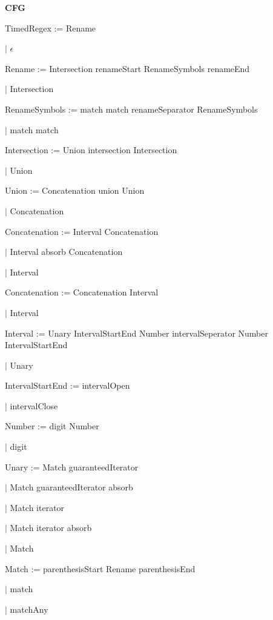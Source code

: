
\textbf{CFG}

TimedRegex := Rename

\qquad	$\mid$ $\epsilon$

Rename := Intersection renameStart RenameSymbols renameEnd

\qquad $\mid$ Intersection

RenameSymbols := match match renameSeparator RenameSymbols

\qquad $\mid$ match match

Intersection := Union intersection Intersection

\qquad $\mid$ Union

Union := Concatenation union Union

\qquad $\mid$ Concatenation

Concatenation := Interval Concatenation

\qquad $\mid$ Interval absorb Concatenation

\qquad $\mid$ Interval

Concatenation := Concatenation Interval

\qquad $\mid$ Interval

Interval := Unary IntervalStartEnd Number intervalSeperator Number IntervalStartEnd

\qquad $\mid$ Unary

IntervalStartEnd := intervalOpen

\qquad $\mid$ intervalClose

Number := digit Number

\qquad $\mid$ digit

Unary := Match guaranteedIterator

\qquad $\mid$ Match guaranteedIterator absorb

\qquad $\mid$ Match iterator

\qquad $\mid$ Match iterator absorb

\qquad $\mid$ Match

Match := parenthesisStart Rename parenthesisEnd

\qquad $\mid$ match

\qquad $\mid$ matchAny

